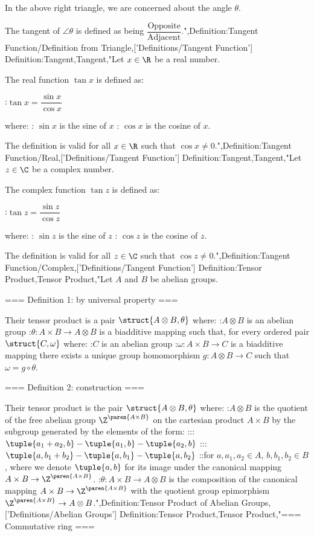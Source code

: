 In the above right triangle, we are concerned about the angle $\theta$.

The tangent of $\angle \theta$ is defined as being $\dfrac{\text{Opposite}} {\text{Adjacent}}$.",Definition:Tangent Function/Definition from Triangle,['Definitions/Tangent Function']
Definition:Tangent,Tangent,"Let $x \in \R$ be a real number.

The real function $\tan x$ is defined as:

:$\tan x = \dfrac {\sin x} {\cos x}$

where:
: $\sin x$ is the sine of $x$
: $\cos x$ is the cosine of $x$.

The definition is valid for all $x \in \R$ such that $\cos x \ne 0$.",Definition:Tangent Function/Real,['Definitions/Tangent Function']
Definition:Tangent,Tangent,"Let $z \in \C$ be a complex number.

The complex function $\tan z$ is defined as:

:$\tan z = \dfrac {\sin z} {\cos z}$

where:
: $\sin z$ is the sine of $z$
: $\cos z$ is the cosine of $z$.

The definition is valid for all $z \in \C$ such that $\cos z \ne 0$.",Definition:Tangent Function/Complex,['Definitions/Tangent Function']
Definition:Tensor Product,Tensor Product,"Let $A$ and $B$ be abelian groups.


=== Definition 1: by universal property ===

Their tensor product is a pair $\struct {A \otimes B, \theta}$ where:
:$A \otimes B$ is an abelian group
:$\theta : A \times B \to A \otimes B$ is a biadditive mapping such that, for every ordered pair $\struct {C, \omega}$ where:
:$C$ is an abelian group
:$\omega : A \times B \to C$ is a biadditive mapping
there exists a unique group homomorphism $g : A \otimes B \to C$ such that $\omega = g \circ \theta$.


=== Definition 2: construction ===

Their tensor product is the pair $\struct {A \otimes B, \theta}$ where:
:$A \otimes B$ is the quotient of the free abelian group $\Z^{\paren {A \times B} }$ on the cartesian product $A \times B$ by the subgroup generated by the elements of the form:
:::$\tuple {a_1 + a_2, b} - \tuple {a_1, b} - \tuple {a_2, b}$
:::$\tuple {a, b_1 + b_2} - \tuple {a, b_1} - \tuple {a, b_2}$
::for $a, a_1, a_2 \in A$, $b, b_1, b_2 \in B$, where we denote $\tuple {a, b}$ for its image under the canonical mapping $A \times B \to \Z^{\paren {A \times B} }$.
:$\theta : A \times B \to A \otimes B$ is the composition of the canonical mapping $A \times B \to \Z^{\paren {A \times B} }$ with the quotient group epimorphism $\Z^{\paren {A \times B} } \to A \otimes B$.",Definition:Tensor Product of Abelian Groups,['Definitions/Abelian Groups']
Definition:Tensor Product,Tensor Product,"=== Commutative ring ===

